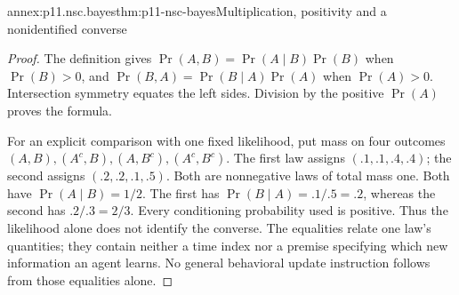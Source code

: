 \begin{annexitem}{annex:p11.nsc.bayes}{thm:p11-nsc-bayes}{Multiplication, positivity and a nonidentified converse}
\begin{proof}
The definition gives \(\Pr(A,B)=\Pr(A\mid B)\Pr(B)\) when
\(\Pr(B)>0\), and \(\Pr(B,A)=\Pr(B\mid A)\Pr(A)\) when
\(\Pr(A)>0\). Intersection symmetry equates the left sides. Division
by the positive \(\Pr(A)\) proves the formula.

For an explicit comparison with one fixed likelihood, put mass on four
outcomes \((A,B),(A^c,B),(A,B^c),(A^c,B^c)\). The first law assigns
\((.1,.1,.4,.4)\); the second assigns \((.2,.2,.1,.5)\).
Both are nonnegative laws of total mass one. Both have
\(\Pr(A\mid B)=1/2\). The first has \(\Pr(B\mid A)=.1/.5=.2\),
whereas the second has \(.2/.3=2/3\). Every conditioning probability
used is positive. Thus the likelihood alone does not identify the converse.
The equalities relate one law's quantities; they contain neither a time
index nor a premise specifying which new information an agent learns.
No general behavioral update instruction follows from those equalities alone.
\end{proof}
\end{annexitem}


